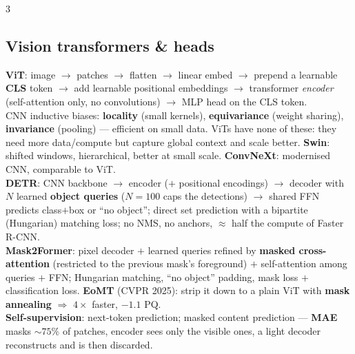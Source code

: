 \documentclass[9pt,a4paper,landscape]{extarticle}
\newcommand{\key}[1]{\textbf{#1}}
\begin{document}
\begin{multicols}{3}
\subsection{Vision transformers \& heads}
\key{ViT}: image $\to$ patches $\to$ flatten $\to$ linear embed $\to$ prepend a learnable \key{CLS} token $\to$ add learnable positional embeddings $\to$ transformer \emph{encoder} (self-attention only, no convolutions) $\to$ MLP head on the CLS token.\\
CNN inductive biases: \key{locality} (small kernels), \key{equivariance} (weight sharing), \key{invariance} (pooling) --- efficient on small data. ViTs have none of these: they need more data/compute but capture global context and scale better. \key{Swin}: shifted windows, hierarchical, better at small scale. \key{ConvNeXt}: modernised CNN, comparable to ViT.\\
\key{DETR}: CNN backbone $\to$ encoder ($+$ positional encodings) $\to$ decoder with $N$ learned \key{object queries} ($N=100$ caps the detections) $\to$ shared FFN predicts class$+$box or ``no object''; direct set prediction with a bipartite (Hungarian) matching loss; no NMS, no anchors, $\approx$ half the compute of Faster R-CNN.\\
\key{Mask2Former}: pixel decoder $+$ learned queries refined by \key{masked cross-attention} (restricted to the previous mask's foreground) $+$ self-attention among queries $+$ FFN; Hungarian matching, ``no object'' padding, mask loss $+$ classification loss. \key{EoMT} (CVPR 2025): strip it down to a plain ViT with \key{mask annealing} $\Rightarrow$ $4\times$ faster, $-1.1$ PQ.\\
\key{Self-supervision}: next-token prediction; masked content prediction --- \key{MAE} masks $\sim75\%$ of patches, encoder sees only the visible ones, a light decoder reconstructs and is then discarded.


\end{multicols}
\end{document}
